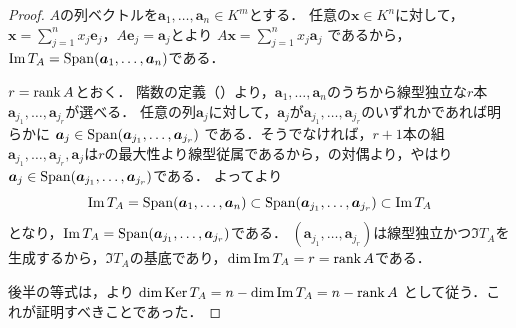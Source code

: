 \begin{tleftbar}
\begin{proof}
  $A$の列ベクトルを$\bm{a}_1, \dots, \bm{a}_n \in K^m$とする．
  任意の$\bm{x} \in K^n$に対して，$\bm{x} = \sum_{j=1}^{n} x_j \bm{e}_j$，$A\bm{e}_j = \bm{a}_j$とより
  $A\bm{x} = \sum_{j=1}^{n} x_j \bm{a}_j$
  であるから，$\operatorname{Im} T_A = \operatorname{Span}(\bm{a}_1, \dots, \bm{a}_n)$である．

  $r = \operatorname{rank} A$とおく．
  階数の定義（）より，$\bm{a}_1, \dots, \bm{a}_n$のうちから線型独立な$r$本$\bm{a}_{j_1}, \dots, \bm{a}_{j_r}$が選べる．
  任意の列$\bm{a}_j$に対して，$\bm{a}_j$が$\bm{a}_{j_1}, \dots, \bm{a}_{j_r}$のいずれかであれば明らかに
  $\bm{a}_j \in \operatorname{Span}(\bm{a}_{j_1}, \dots, \bm{a}_{j_r})$
  である．そうでなければ，$r + 1$本の組$\bm{a}_{j_1}, \dots, \bm{a}_{j_r}, \bm{a}_j$は$r$の最大性より線型従属であるから，の対偶より，やはり$\bm{a}_j \in \operatorname{Span}(\bm{a}_{j_1}, \dots, \bm{a}_{j_r})$である．
  よってより
  \[
    \operatorname{Im} T_A = \operatorname{Span}(\bm{a}_1, \dots, \bm{a}_n)
    \subset \operatorname{Span}(\bm{a}_{j_1}, \dots, \bm{a}_{j_r})
    \subset \operatorname{Im} T_A
  \]
  となり，$\operatorname{Im} T_A = \operatorname{Span}(\bm{a}_{j_1}, \dots, \bm{a}_{j_r})$である．
  $(\bm{a}_{j_1}, \dots, \bm{a}_{j_r})$は線型独立かつ$\Im T_A$を生成するから，$\Im T_A$の基底であり，$\dim \operatorname{Im} T_A = r = \operatorname{rank} A$である．

  後半の等式は，より
  $\dim \operatorname{Ker} T_A = n - \dim \operatorname{Im} T_A = n - \operatorname{rank} A$
  として従う．これが証明すべきことであった．
\end{proof}
\end{tleftbar}

